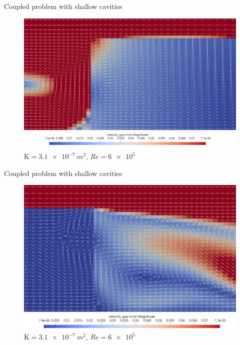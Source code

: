 \documentclass{beamer}
\begin{document}
\begin{frame}{Coupled problem with shallow cavities}
\begin{figure}
	\centering
	\includegraphics[height=0.82\textheight]{coupled_first_cavity.png}
	\caption{\tiny $\mathrm{K}=\SI{3.1e-7}{m^2}$, $Re=\num{6e5}$}
\end{figure}
\end{frame}
\begin{frame}{Coupled problem with shallow cavities}
\begin{figure}
	\centering
	\includegraphics[height=0.82\textheight]{coupled_second_cavity.png}
	\caption{\tiny $\mathrm{K}=\SI{3.1e-7}{m^2}$, $Re=\num{6e5}$}
\end{figure}
\end{frame}
\end{document}
